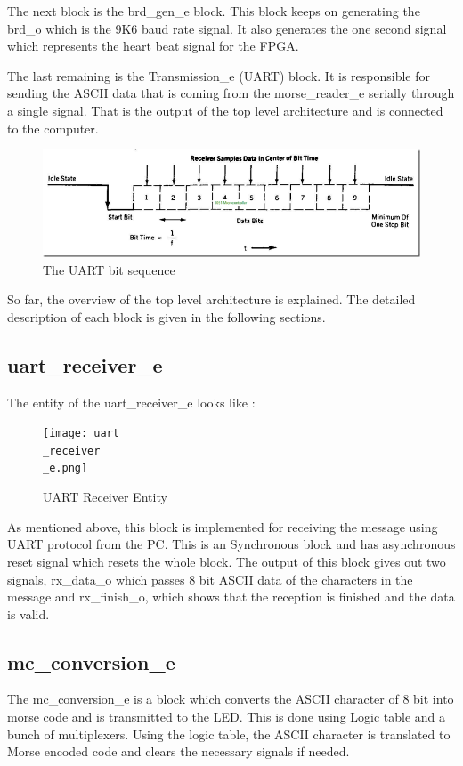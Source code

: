 \documentclass[12pt,a4paper]{article}
\begin{document}
The next block is the brd\_gen\_e block. This block keeps on generating the brd\_o which is the 9K6 baud rate signal. It also generates the one second signal which represents the heart beat signal for the FPGA.

The last remaining is the Transmission\_e (UART) block. It is responsible for sending the ASCII data that is coming from the morse\_reader\_e serially through a single signal. That is the output of the top level architecture and is connected to the computer.
\begin{figure}[H]
\centering
\includegraphics[width=\linewidth]{urattime.png}
\caption{The UART bit sequence }
\label{the UART bit sequence }
\end{figure}

So far, the overview of the top level architecture is explained. The detailed description of each block is given in the following sections.\

\subsection{uart\_receiver\_e}
The entity of the uart\_receiver\_e looks like :\\

\begin{figure}[H]
\centering
\texttt{[image: uart\\\_receiver\\\_e.png]}
\caption{UART Receiver Entity}
\label{UART Receiver Entity}
\end{figure}

As mentioned above, this block is implemented for receiving the message using UART protocol from the PC. This is an Synchronous block and has asynchronous reset signal which resets the whole block. The output of this block gives out two signals, rx\_data\_o which passes 8 bit ASCII data of the characters in the message and rx\_finish\_o, which shows that the reception is finished and the data is valid. 


\subsection{mc\_conversion\_e}
The mc\_conversion\_e is a block which converts the ASCII character of 8 bit into morse code and is transmitted to the LED. This is done using Logic table and a bunch of multiplexers. Using the logic table, the ASCII character is translated to Morse encoded code and clears the necessary signals if needed. \\
\end{document}
